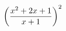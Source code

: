 \documentclass[preview]{standalone}
\begin{document}
\begin{align*}
\special{dvisvgm:raw <g id='unique000'>}\left(\frac{x^2+2x+1}{x+1}\right)^2\special{dvisvgm:raw </g>}
\end{align*}
\end{document}
